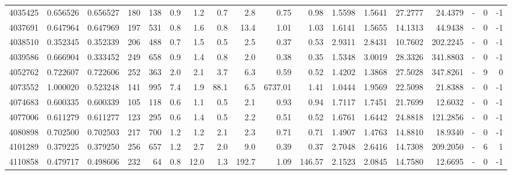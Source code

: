 \begin{tabular}{rrrrrrrrrrrrrrrlrr}
   4035425 & 0.656526 &   0.656527 &  180 &  138 &      0.9 &      1.2 &     0.7 &      2.8 &       0.75 &        0.98 &  1.5598 &  1.5641 &   27.2777 &   24.4379 &             - &        0 &         -1 \\
   4037691 & 0.647964 &   0.647969 &  197 &  531 &      0.8 &      1.6 &     0.8 &     13.4 &       1.01 &        1.03 &  1.6141 &  1.5655 &   14.1313 &   44.9438 &             - &        0 &         -1 \\
   4038510 & 0.352345 &   0.352339 &  206 &  488 &      0.7 &      1.5 &     0.5 &      2.5 &       0.37 &        0.53 &  2.9311 &  2.8431 &   10.7602 &  202.2245 &             - &        0 &         -1 \\
   4039586 & 0.666904 &   0.333452 &  249 &  658 &      0.9 &      1.4 &     0.8 &      2.0 &       0.38 &        0.35 &  1.5348 &  3.0019 &   28.3326 &  341.8803 &             - &        0 &         -1 \\
   4052762 & 0.722607 &   0.722606 &  252 &  363 &      2.0 &      2.1 &     3.7 &      6.3 &       0.59 &        0.52 &  1.4202 &  1.3868 &   27.5028 &  347.8261 &             - &        9 &          0 \\
   4073552 & 1.000020 &   0.523248 &  141 &  995 &      7.4 &      1.9 &    88.1 &      6.5 &    6737.01 &        1.41 &  1.0444 &  1.9569 &   22.5098 &   21.8388 &             - &        0 &         -1 \\
   4074683 & 0.600335 &   0.600339 &  105 &  118 &      0.6 &      1.1 &     0.5 &      2.1 &       0.93 &        0.94 &  1.7117 &  1.7451 &   21.7699 &   12.6032 &             - &        0 &         -1 \\
   4077006 & 0.611279 &   0.611277 &  123 &  295 &      0.6 &      1.4 &     0.5 &      2.2 &       0.51 &        0.52 &  1.6761 &  1.6442 &   24.8818 &  121.2856 &             - &        0 &         -1 \\
   4080898 & 0.702500 &   0.702503 &  217 &  700 &      1.2 &      1.2 &     2.1 &      2.3 &       0.71 &        0.71 &  1.4907 &  1.4763 &   14.8810 &   18.9340 &             - &        0 &         -1 \\
   4101289 & 0.379225 &   0.379250 &  256 &  657 &      1.2 &      2.7 &     2.0 &      9.0 &       0.39 &        0.37 &  2.7048 &  2.6416 &   14.7308 &  209.2050 &             - &        6 &          1 \\
   4110858 & 0.479717 &   0.498606 &  232 &   64 &      0.8 &     12.0 &     1.3 &    192.7 &       1.09 &      146.57 &  2.1523 &  2.0845 &   14.7580 &   12.6695 &             - &        0 &         -1 \\

\end{tabular}
